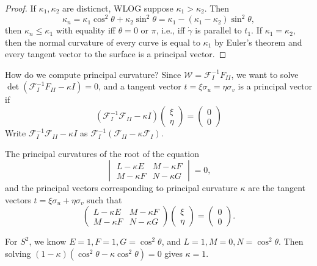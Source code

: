 \begin{proof}
    If $\kappa_1,\kappa_2$ are disticnct, WLOG suppose $\kappa_1>\kappa_2$. Then \[
        \kappa_n =\kappa_1\cos ^2 \theta+\kappa_2\sin ^2 \theta=\kappa_1-(\kappa_1-\kappa_2)\sin ^2 \theta,
    \] then $\kappa_n  \leq \kappa_1$ with equality iff $\theta=0$ or $\pi$, i.e., iff $\dot \gamma $ is parallel to $t_1$. If $\kappa_1=\kappa_2$, then the normal curvature of every curve is equal to  $\kappa_1$ by Euler's theorem and every tangent vector to the surface is a principal vector.
\end{proof}
How do we compute principal curvature? Since $\mathcal{W} =\mathcal{F} _{I}^{-1}F_{II}$, we want to solve $\det (\mathcal{F} ^{-1}_I F_{II}-\kappa I)=0$, and a tangent vector $t= \xi\sigma_u=\eta \sigma_v$ is a principal vector if \[
    (\mathcal{F} _I ^{-1}\mathcal{F} _{II}-\kappa I)
    \begin{pmatrix}
        \xi \\ \eta
    \end{pmatrix}= 
    \begin{pmatrix}
        0 \\0
    \end{pmatrix}
\] Write $\mathcal{F} _I ^{-1}\mathcal{F} _{II}-\kappa I$ as $\mathcal{F} _I ^{-1}(\mathcal{F} _{II}-\kappa \mathcal{F} _I)$.
\begin{prop}
    The principal curvatures of the root of the equation \[
    \begin{vmatrix}
        L- \kappa E & M - \kappa F \\ M - \kappa F & N - \kappa G
    \end{vmatrix}=0,
    \] and the principal vectors corresponding to principal curvature $\kappa$ are the tangent vectors $t= \xi \sigma_u+\eta \sigma_v$ such that \[
    \begin{pmatrix}
        L- \kappa E & M - \kappa F \\ M - \kappa F & N - \kappa G
    \end{pmatrix}
    \begin{pmatrix}
        \xi \\ \eta
    \end{pmatrix}=
    \begin{pmatrix}
        0 \\ 0
    \end{pmatrix}.
    \] 
\end{prop}
\begin{example}
    For $S^2$, we know $E=1,F=1,G=\cos ^2 \theta$, and $L=1,M=0, N= \cos ^2 \theta$. Then solving $(1-\kappa)(\cos ^2 \theta- \kappa \cos ^2 \theta)=0$ gives $\kappa=1$.
\end{example}
